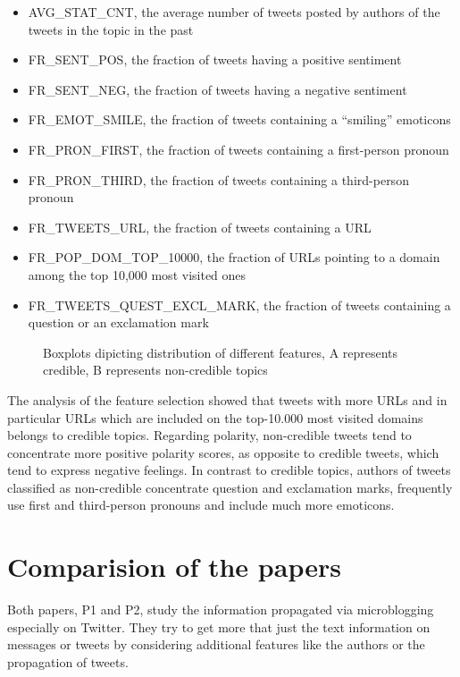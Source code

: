 \documentclass{proseminar}
\begin{document}
\begin{itemize}
\item AVG\_STAT\_CNT, the average number of tweets posted by authors of the tweets in the topic in the past
\item FR\_SENT\_POS, the fraction of tweets having a positive sentiment
\item FR\_SENT\_NEG, the fraction of tweets having a negative sentiment
\item FR\_EMOT\_SMILE, the fraction of tweets containing a “smiling” emoticons
\item FR\_PRON\_FIRST, the fraction of tweets containing a first-person pronoun
\item FR\_PRON\_THIRD, the fraction of tweets containing a third-person pronoun
\item FR\_TWEETS\_URL, the fraction of tweets containing a URL
\item FR\_POP\_DOM\_TOP\_10000, the fraction of URLs pointing to a domain among the top 10,000 most visited ones
\item FR\_TWEETS\_QUEST\_EXCL\_MARK, the fraction of tweets containing a question or an exclamation mark
\end{itemize}


\begin{figure}[h]
\centering
{}
\caption{Boxplots dipicting distribution of different features, A represents credible, B represents non-credible topics}
\label{fig:boxCredibility}
\end{figure}

The analysis of the feature selection showed that tweets with more URLs and in particular URLs which are included on the top-10.000 most visited domains belongs to credible topics. 
Regarding polarity, non-credible tweets tend to concentrate more positive polarity scores, as opposite to credible tweets, which tend to express negative feelings.
In contrast to credible topics, authors of tweets classified as non-credible concentrate question and exclamation marks, frequently use first and third-person pronouns and include much more emoticons.



\section{Comparision of the papers}
Both papers, P1 and P2, study the information propagated via microblogging especially on Twitter. They try to get more that just the text information on messages or tweets by considering additional features like the authors or the propagation of tweets.
\end{document}

